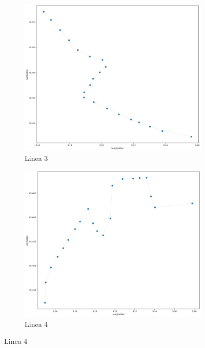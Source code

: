 \begin{figure}[htbp]
  \vspace{0.02\textheight}
  \begin{subfigure}[b]{0.40\textwidth}
    \centering
    \includegraphics[width=\textwidth]{Immagini/Capitoli/cap3/rete_3.png}
    \caption{Linea 3}
    \label{fig:m3}
  \end{subfigure}%
  \hspace{0.03\textwidth}
  \begin{subfigure}[b]{0.40\textwidth}
    \centering
    \includegraphics[width=\textwidth]{Immagini/Capitoli/cap3/rete_4.png}
    \caption{Linea 4}
    \label{fig:m4}
  \end{subfigure}


\end{figure}
